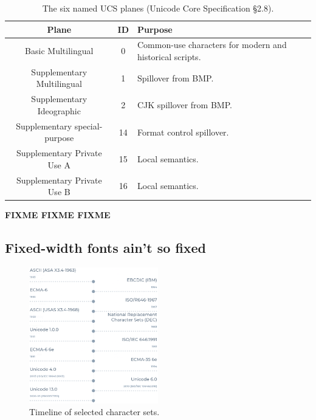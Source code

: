 \documentclass[letterpaper,10pt]{article}
\begin{document}
\begin{table}[!htb]
  \begin{center}
    \begin{tabular}{ |c|c|l| }
      \hline
      Plane & ID & Purpose \\
      \hline
      \hline
      Basic Multilingual & 0 & Common-use characters for modern and historical scripts. \\
      \hline
      Supplementary Multilingual & 1 & Spillover from BMP. \\
      \hline
      Supplementary Ideographic & 2 & CJK spillover from BMP. \\
      \hline
      Supplementary special-purpose & 14 & Format control spillover. \\
      \hline
      Supplementary Private Use A & 15 & Local semantics. \\
      \hline
      Supplementary Private Use B & 16 & Local semantics. \\
      \hline
    \end{tabular}
  \end{center}
  \caption[The six named UCS planes.]{The six named UCS planes (Unicode Core Specification §2.8\cite{unicode}).}
  \label{table:ucsplanes}
\end{table}

\textbf{FIXME FIXME FIXME}

\subsection{Fixed-width fonts ain't so fixed}

\begin{figure}
\centering
\includegraphics[width=0.5\textwidth]{media/charset-timeline.png}
\caption{Timeline of selected character sets.}
\label{fig:charset-timeline}
\end{figure}
\end{document}
